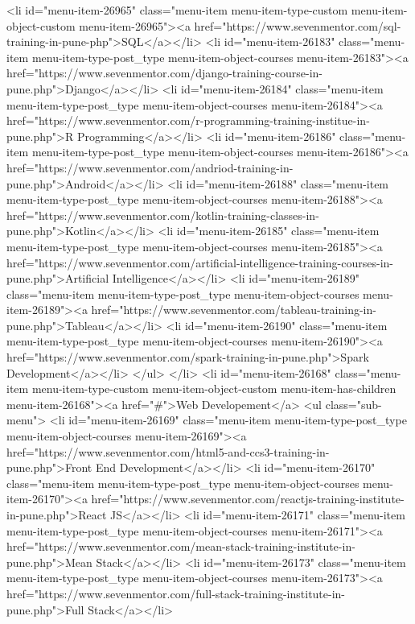 {<li id="menu-item-26965" class="menu-item menu-item-type-custom menu-item-object-custom menu-item-26965"><a href="https://www.sevenmentor.com/sql-training-in-pune-php">SQL</a></li>
<li id="menu-item-26183" class="menu-item menu-item-type-post_type menu-item-object-courses menu-item-26183"><a href="https://www.sevenmentor.com/django-training-course-in-pune.php">Django</a></li>
<li id="menu-item-26184" class="menu-item menu-item-type-post_type menu-item-object-courses menu-item-26184"><a href="https://www.sevenmentor.com/r-programming-training-institue-in-pune.php">R Programming</a></li>
<li id="menu-item-26186" class="menu-item menu-item-type-post_type menu-item-object-courses menu-item-26186"><a href="https://www.sevenmentor.com/andriod-training-in-pune.php">Android</a></li>
<li id="menu-item-26188" class="menu-item menu-item-type-post_type menu-item-object-courses menu-item-26188"><a href="https://www.sevenmentor.com/kotlin-training-classes-in-pune.php">Kotlin</a></li>
<li id="menu-item-26185" class="menu-item menu-item-type-post_type menu-item-object-courses menu-item-26185"><a href="https://www.sevenmentor.com/artificial-intelligence-training-courses-in-pune.php">Artificial Intelligence</a></li>
<li id="menu-item-26189" class="menu-item menu-item-type-post_type menu-item-object-courses menu-item-26189"><a href="https://www.sevenmentor.com/tableau-training-in-pune.php">Tableau</a></li>
<li id="menu-item-26190" class="menu-item menu-item-type-post_type menu-item-object-courses menu-item-26190"><a href="https://www.sevenmentor.com/spark-training-in-pune.php">Spark Development</a></li>
</ul>
</li>
<li id="menu-item-26168" class="menu-item menu-item-type-custom menu-item-object-custom menu-item-has-children menu-item-26168"><a href="#">Web Developement</a>
<ul class="sub-menu">
<li id="menu-item-26169" class="menu-item menu-item-type-post_type menu-item-object-courses menu-item-26169"><a href="https://www.sevenmentor.com/html5-and-ccs3-training-in-pune.php">Front End Development</a></li>
<li id="menu-item-26170" class="menu-item menu-item-type-post_type menu-item-object-courses menu-item-26170"><a href="https://www.sevenmentor.com/reactjs-training-institute-in-pune.php">React JS</a></li>
<li id="menu-item-26171" class="menu-item menu-item-type-post_type menu-item-object-courses menu-item-26171"><a href="https://www.sevenmentor.com/mean-stack-training-institute-in-pune.php">Mean Stack</a></li>
<li id="menu-item-26173" class="menu-item menu-item-type-post_type menu-item-object-courses menu-item-26173"><a href="https://www.sevenmentor.com/full-stack-training-institute-in-pune.php">Full Stack</a></li>
}
